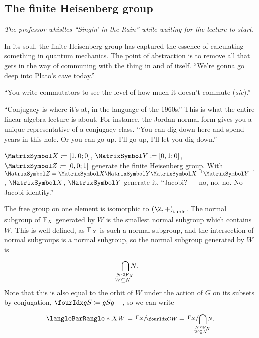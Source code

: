 \documentclass[10pt, a4paper, twoside]{lecturenotes}
\begin{document}
\begin{lecture}[date=2013-03-14, official=true]

\section{The finite Heisenberg group}

\emph{The professor whistles ``Singin' in the Rain'' while waiting for the lecture to start.}

In its soul, the finite Heisenberg group has captured the essence of calculating something in quantum mechanics. The point of abstraction is to remove all that gets in the way of communing with the thing in and of itself. 
``We're gonna go deep into Plato's cave today.''

``You write commutators to see the level of how much it doesn't commute (\emph{sic}).''

 ``Conjugacy is where it's at, in the language of the 1960s.'' This is what the entire linear algebra lecture is about. For instance, the Jordan normal form gives you a unique representative of a conjugacy class. ``You can dig down here and spend years in this hole. Or you can go up. I'll go up, I'll let you dig down.''

$\matX\DefineAs\Helt 1 0 0$, $\matY\DefineAs\Helt 0 1 0$, $\matZ\DefineAs\Helt 0 0 1$ generate the finite Heisenberg group. With $\matZ=\matX\matY\matX^{-1}\matY^{-1}$, $\matX$, $\matY$ generate it. ``Jacobi? --- no, no, no. No Jacobi identity.'' 

The free group on one element is isomorphic to $\tuple{\Z,+}$. The normal subgroup of $\operatorname{F}_{X}$ generated by $W$ is the smallest normal subgroup which contains $W$. This is well-defined, as $\operatorname{F}_{X}$ is such a normal subgroup, and the intersection of normal subgroups is a normal subgroup, so the normal subgroup generated by $W$ is
\begin{equation*}
  \IntersectionOver {
    \LongDomainSpec{
      \mathllap{N\NormalSubgroup} \mathrlap{\FreeGroup X}\\
      \mathllap{W\Subset} \mathrlap{N}
    }
  } N\text{.}
\end{equation*}
Note that this is also equal to the orbit of $W$ under the action of $G$ on its subsets by conjugation, $\LeftConjugationAction g S \DefineAs g S g^{-1}$, so we can write
\begin{equation*}
\GroupPresentation{X}{W} = \QuotientGroup{\FreeGroup X}{\LeftConjugationAction G W} = \QuotientGroup{\FreeGroup X}{
  \IntersectionOver {
    \LongDomainSpec{
      \mathllap{N\NormalSubgroup} \mathrlap{\FreeGroup X}\\
      \mathllap{W\Subset} \mathrlap{N}
    }
  } N\text{.}
}
\end{equation*}


\end{lecture}
\end{document}
